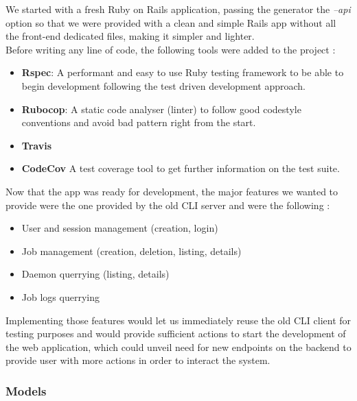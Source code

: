 \documentclass{eplmastersthesis}
\begin{document}
        We started with a fresh Ruby on Rails application, passing the
        generator the \textit{--api} option so that we were provided with
        a clean and simple Rails app without all the front-end dedicated
        files, making it simpler and lighter.\\

        Before writing any line of code, the following tools were added
        to the project :

        \begin{itemize}
          \item \textbf{Rspec}: A performant and easy to use Ruby testing
          framework to be able to begin development following the test
          driven development approach.
          \item \textbf{Rubocop}: A static code analyser (linter) to follow
          good codestyle conventions and avoid bad pattern right from the start.
          \item \textbf{Travis}
          \item \textbf{CodeCov} A test coverage tool to get further
          information on the test suite.
        \end{itemize}

        Now that the app was ready for development, the major features
        we wanted to provide were the one provided by the old CLI server and
        were the following :

        \begin{itemize}
          \item User and session management (creation, login)
          \item Job management (creation, deletion, listing, details)
          \item Daemon querrying (listing, details)
          \item Job logs querrying
        \end{itemize}

        Implementing those features would let us immediately reuse the old
        CLI client for testing purposes and would provide sufficient actions
        to start the development of the web application, which could unveil
        need for new endpoints on the backend to provide user with more
        actions in order to interact the system.\\

        \subsubsection{Models}
\end{document}
